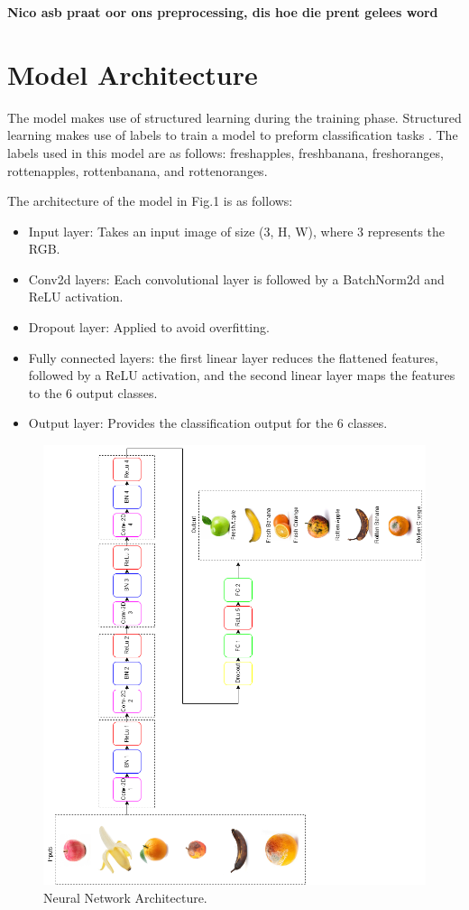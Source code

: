 \documentclass[conference]{IEEEtran}
\begin{document}
\textbf{Nico asb praat oor ons preprocessing, dis hoe die prent gelees word}

\section{Model Architecture}

The model makes use of structured learning during the training phase. Structured learning makes use of labels to train a model to preform classification tasks \cite{b1}. The labels used in this model are as follows: freshapples, freshbanana, freshoranges, rottenapples, rottenbanana, and rottenoranges.

The architecture of the model in Fig.1 is as follows:
\begin{itemize}
    \item Input layer: Takes an input image of size (3, H, W), where 3 represents the RGB.
    \item Conv2d layers: Each convolutional layer is followed by a BatchNorm2d and ReLU activation.
    \item Dropout layer: Applied to avoid overfitting.
    \item Fully connected layers: the first linear layer reduces the flattened features, followed by a ReLU activation, and the second linear layer maps the features to the 6 output classes.
    \item Output layer: Provides the classification output for the 6 classes.
\end{itemize}

\begin{figure}[h]
    \centering
    \includegraphics[width=\linewidth]{Ai Prent.drawio (1).png}
    \caption{Neural Network Architecture.}
    \label{fig}
\end{figure}
\end{document}
